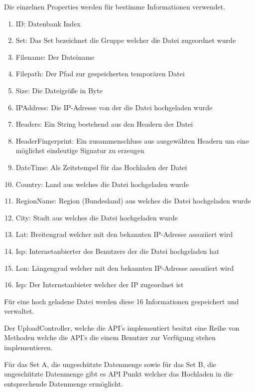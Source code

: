 \documentclass[
    fontsize=12pt,
    headings=small,
    parskip=half,           %
    bibliography=totoc,
    numbers=noenddot,       %
    open=any,               %
    ]{scrreprt}
\begin{document}



Die einzelnen Properties werden für bestimme Informationen verwendet.

\begin{enumerate}
\item ID: Datenbank Index
\item Set: Das Set bezeichnet die Gruppe welcher die Datei zugeordnet wurde
\item Filename: Der Dateiname
\item Filepath: Der Pfad zur gespeicherten temporären Datei
\item Size: Die Dateigröße in Byte
\item IPAddress: Die IP-Adresse von der die Datei hochgeladen wurde
\item Headers: Ein String bestehend aus den Headern der Datei
\item HeaderFingerprint: Ein zusammenschluss aus ausgewähten Headern um eine möglichst eindeutige Signatur zu erzeugen
\item DateTime: Als Zeitstempel für das Hochladen der Datei
\item Country: Land aus welches die Datei hochgeladen wurde
\item RegionName: Region (Bundesland) aus welches die Datei hochgeladen wurde
\item City: Stadt aus welches die Datei hochgeladen wurde
\item Lat: Breitengrad welcher mit den bekannten IP-Adresse assoziiert wird
\item Isp: Internetanbierter des Benutzers der die Datei hochgeladen hat
\item Lon: Längengrad welcher mit den bekannten IP-Adresse assoziiert wird
\item Isp: Der Internetanbieter welcher der IP zugeordnet ist
\end{enumerate}

Für eine hoch geladene Datei werden diese 16 Informationen gespeichert und verwaltet.

Der UploadController, welche die API's implementiert besitzt eine Reihe von Methoden welche die API's die einem Benutzer zur Verfügung stehen implementieren. 

Für das Set A, die ungeschützte Datenmenge sowie für das Set B, die ungeschützte Datenmenge gibt es API Punkt welcher das Hochladen in die entsprechende Datenmenge ermöglicht. 


\end{document}
